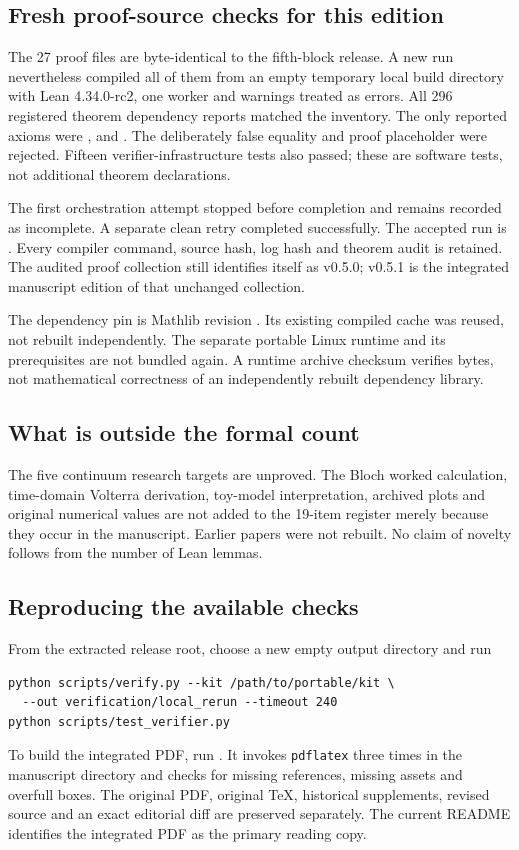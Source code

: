 \documentclass[11pt]{article}
\theoremstyle{definition}
\theoremstyle{remark}
\begin{document}
\subsection{Fresh proof-source checks for this edition}
The 27 proof files are byte-identical to the fifth-block release. A new run nevertheless compiled all of them from an empty temporary local build directory with Lean 4.34.0-rc2, one worker and warnings treated as errors. All 296 registered theorem dependency reports matched the inventory. The only reported axioms were ,  and . The deliberately false equality and proof placeholder were rejected. Fifteen verifier-infrastructure tests also passed; these are software tests, not additional theorem declarations.

The first orchestration attempt stopped before completion and remains recorded as incomplete. A separate clean retry completed successfully. The accepted run is . Every compiler command, source hash, log hash and theorem audit is retained. The audited proof collection still identifies itself as v0.5.0; v0.5.1 is the integrated manuscript edition of that unchanged collection.

The dependency pin is Mathlib revision . Its existing compiled cache was reused, not rebuilt independently. The separate portable Linux runtime and its prerequisites are not bundled again. A runtime archive checksum verifies bytes, not mathematical correctness of an independently rebuilt dependency library.

\subsection{What is outside the formal count}
The five continuum research targets are unproved. The Bloch worked calculation, time-domain Volterra derivation, toy-model interpretation, archived plots and original numerical values are not added to the 19-item register merely because they occur in the manuscript. Earlier papers were not rebuilt. No claim of novelty follows from the number of Lean lemmas.

\subsection{Reproducing the available checks}
From the extracted release root, choose a new empty output directory and run
\begin{lstlisting}[language={}]
python scripts/verify.py --kit /path/to/portable/kit \
  --out verification/local_rerun --timeout 240
python scripts/test_verifier.py
\end{lstlisting}
To build the integrated PDF, run . It invokes \texttt{pdflatex} three times in the manuscript directory and checks for missing references, missing assets and overfull boxes. The original PDF, original TeX, historical supplements, revised source and an exact editorial diff are preserved separately. The current README identifies the integrated PDF as the primary reading copy.
\end{document}

